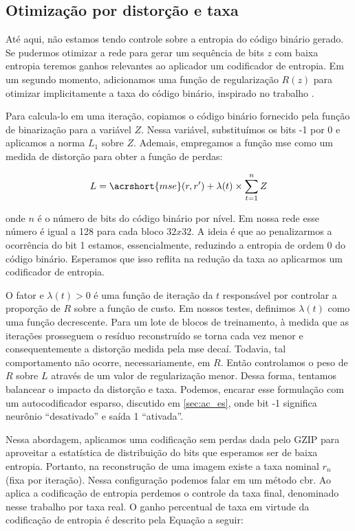 \subsection{Otimização por distorção e taxa}

Até aqui, não estamos tendo controle sobre a entropia do código binário gerado. Se pudermos otimizar a rede para gerar um sequência de bits $z$ com baixa entropia teremos ganhos relevantes ao aplicador um codificador de entropia.
Em um segundo momento, adicionamos uma função de regularização $R(z)$ para otimizar implicitamente a taxa do código binário, inspirado no trabalho \cite{zhao1901cae}. 

Para calcula-lo em uma iteração, copiamos o código binário fornecido pela função de binarização  para a variável $Z$. Nessa variável, substituímos os bits -1 por 0 e aplicamos a norma $L_1$ sobre $Z$. Ademais, empregamos a função \acrshort{mse} como um medida de distorção para obter a função de perdas:   

\begin{equation}
\label{eq:rdo}
L = \acrshort{mse}(r,r') + \lambda(t) \times \sum_{t=1}^{n} Z 
\end{equation}


onde $n$ é o número de bits do código binário por nível. Em nossa rede esse número é igual a 128 para cada bloco $32x32$. A ideia é que ao penalizarmos a ocorrência do bit 1 estamos, essencialmente, reduzindo a entropia de ordem 0 do código binário. Esperamos que isso reflita na redução da taxa ao aplicarmos um codificador de entropia.   

O fator e $\lambda(t)>0$ é uma função de iteração da $t$ responsável por controlar a proporção de $R$ sobre a função de custo. Em nossos testes, definimos $\lambda(t)$ como uma função decrescente. Para um lote de blocos de treinamento, à medida que as iterações prosseguem o resíduo reconstruído se torna cada vez menor e consequentemente a distorção medida pela \acrshort{mse} decaí. Todavia, tal comportamento não ocorre, necessariamente, em $R$. Então controlamos o peso de $R$ sobre  $L$ através de um valor de regularização menor. Dessa forma, tentamos balancear o impacto da distorção e taxa. Podemos, encarar esse formulação com um autocodificador esparso, discutido em \ref{sec:ac_es}, onde bit -1 significa neurônio ``desativado'' e saída 1 ``ativada''. 

   
Nessa abordagem, aplicamos uma codificação sem perdas dada pelo GZIP para aproveitar a estatística de distribuição do bits que esperamos ser de baixa entropia. Portanto, na reconstrução de uma imagem existe a taxa nominal $r_n$ (fixa por iteração). Nessa configuração podemos falar em um método \gls{cbr}. Ao aplica a codificação de entropia perdemos o controle da taxa final, denominado nesse trabalho por taxa real.  O ganho percentual de taxa em virtude da codificação de entropia é descrito pela Equação a seguir:

